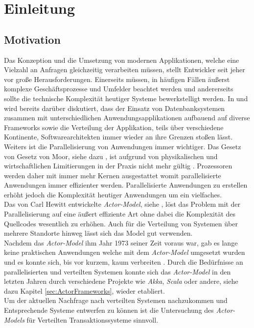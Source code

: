 \chapter{Einleitung}\label{cha:introduction}
\section{Motivation}\label{sec:introduction:motivation}
Das Konzeption und die Umsetzung von modernen Applikationen, welche eine Vielzahl an Anfragen gleichzeitig verarbeiten müssen, stellt Entwickler seit jeher vor große Herausforderungen. Einerseits müssen, in häufigen Fällen äußerst komplexe Geschäftsprozesse und Umfelder beachtet werden und andererseits sollte die technische Komplexität heutiger Systeme bewerkstelligt werden. In \cite{Vernon2015ReactiveAkka} und \cite{Evans2004Domain-drivenSoftware} wird bereits darüber diskutiert, dass der Einsatz von Datenbanksystemen zusammen mit unterschiedlichen Anwendungsapplikationen aufbauend auf diverse Frameworks sowie die Verteilung der Applikation, teils über verschiedene Kontinente, Softwarearchitekten immer wieder an ihre Grenzen stoßen lässt. \\
Weiters ist die Parallelisierung von Anwendungen immer wichtiger. Das Gesetz von Gesetz von Moor, siehe dazu \cite{moore1965moore}, ist aufgrund von physikalischen und wirtschaftlichen Limitierungen in der Praxis nicht mehr gültig \citep{mann2000end}. Prozessoren werden daher mit immer mehr Kernen ausgestattet womit parallelisierte Anwendungen immer effizienter werden. Parallelisierte Anwendungen zu erstellen erhöht jedoch die Komplexität heutiger Anwendungen um ein vielfaches. \\
Das von Carl Hewitt entwickelte \textit{Actor-Model}, siehe \cite{Hewitt1973AIntelligence}, löst das Problem mit der Parallelisierung auf eine äußert effiziente Art ohne dabei die Komplexität des Quellcodes wesentlich zu erhöhen. Auch für die Verteilung von Systemen über mehrere Standorte hinweg lässt sich das Model gut verwenden. \\
Nachdem das \textit{Actor-Model} ihm Jahr 1973 seiner Zeit voraus war, gab es lange keine praktischen Anwendungen welche mit dem \textit{Actor-Model} umgesetzt wurden und es konnte sich, bis vor kurzem, kaum verbreiten \citep{mackay1997has}. Durch die Bedürfnisse an parallelisierten und verteilten Systemen konnte sich das \textit{Actor-Model} in den letzten Jahren durch verschiedene Projekte wie \textit{Akka}, \textit{Scala} oder andere, siehe dazu Kapitel \ref{sec:ActorFrameworks}, wieder etabliert. \\
Um der aktuellen Nachfrage nach verteilten Systemen nachzukommen und Entsprechende Systeme entwerfen zu können ist die Untersuchung des \textit{Actor-Models} für Verteilten Transaktionssysteme sinnvoll.

